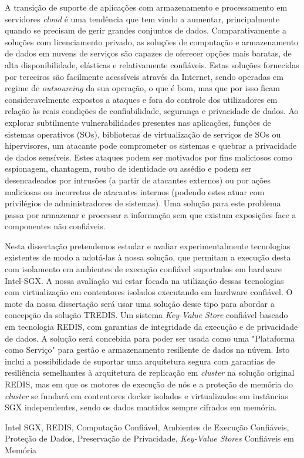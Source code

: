 A transição de suporte de aplicações com armazenamento e processamento em servidores \textit{cloud} é uma tendência que tem vindo a aumentar, principalmente quando se precisam de gerir grandes conjuntos de dados. Comparativamente a soluções com licenciamento privado, as soluções de computação e armazenamento de dados em nuvens de serviços são capazes de oferecer opções mais baratas, de alta disponibilidade, elásticas e relativamente confiáveis. Estas soluções fornecidas por terceiros são facilmente acessíveis através da Internet, sendo operadas em regime de \textit{outsourcing} da sua operação, o que é bom, mas que por isso ficam consideravelmente expostos a ataques e fora do controle dos utilizadores em relação às reais condições de confiabilidade, segurança e privacidade de dados. Ao explorar subtilmente vulnerabilidades presentes nas aplicações, funções de sistemas operativos (SOs), bibliotecas de virtualização de serviços de SOs ou hipervisores, um atacante pode comprometer os sistemas e quebrar a privacidade de dados sensíveis. Estes ataques podem ser motivados por fins maliciosos como espionagem, chantagem, roubo de identidade ou assédio e podem ser desencadeados por intrusões (a partir de atacantes externos) ou por ações maliciosas ou incorretas de atacantes internos (podendo estes atuar com privilégios de administradores de sistemas). Uma solução para este problema passa por armazenar e processar a informação sem que existam exposições face a componentes não confiáveis. 

Nesta dissertação pretendemos estudar e avaliar experimentalmente tecnologias existentes de modo a adotá-las à nossa solução, que permitam a execução desta com isolamento em ambientes de execução confiável suportados em hardware Intel-SGX. A nossa avaliação vai estar focada na utilização dessas tecnologias com virtualização em contentores isolados executando em hardware confiável. O mote da nossa dissertação será usar uma solução desse tipo para abordar a concepção da solução TREDIS. Um sistema \textit{Key-Value Store} confiável baseado em tecnologia REDIS, com garantias de integridade da execução e de privacidade de dados. A solução será concebida para poder ser usada como uma "Plataforma como Serviço" para gestão e armazenamento resiliente de dados na núvem. Isto inclui a possibilidade de suportar uma arquitetura segura com garantias de resiliência semelhantes à arquitetura de replicação em \textit{cluster} na solução original REDIS, mas em que os motores de execução de nós e a proteção de memória do \textit{cluster} se fundará em contentores docker isolados e virtualizados em instâncias SGX independentes, sendo os dados mantidos sempre cifrados em memória.

 
	
\begin{keywords}
 Intel SGX, REDIS, Computação Confiável, Ambientes de Execução Confiáveis, Proteção de Dados, Preservação de Privacidade, \textit{Key-Value Stores} Confiáveis em Memória
\end{keywords}


	
